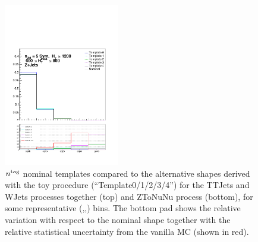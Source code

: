 \begin{figure}[h!]
  \includegraphics[width=0.45\textwidth]{figures/btagformula/uncertainties/Zinveq5j_1200Inc_600800}
  \caption{\label{fig:formula-uncertainties}
  $n^{\rm tag}$ nominal templates compared to the alternative shapes derived with the toy procedure (``Template0/1/2/3/4'') 
  for the TTJets and WJets processes together (top) and ZToNuNu process (bottom), for some representative (\njet,\scalht,\mht) bins. 
  The bottom pad shows the relative variation with respect to the nominal shape together with the relative statistical uncertainty 
  from the vanilla MC (shown in red).}
\end{figure}
